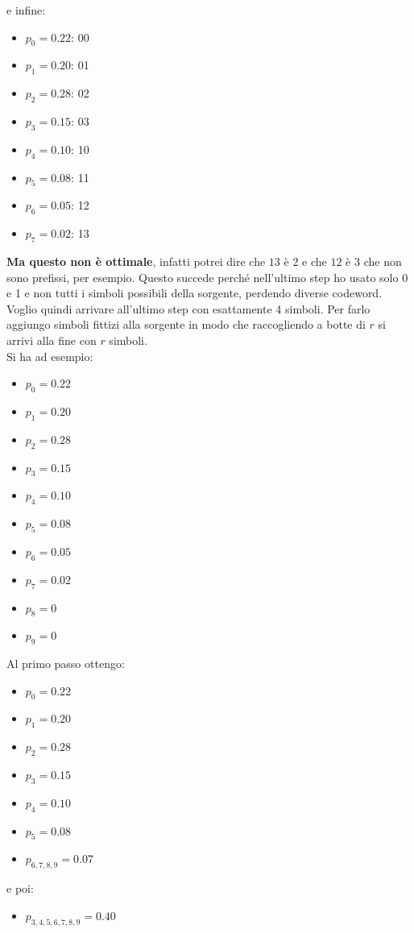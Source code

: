 \documentclass[a4paper,12pt, oneside]{book}
\begin{document}
\begin{esempio}
  e infine:
  \begin{itemize}
    \item $p_0=0.22$: 00
    \item $p_1=0.20$: 01
    \item $p_2=0.28$: 02
    \item $p_3=0.15$: 03
    \item $p_4=0.10$: 10
    \item $p_5=0.08$: 11
    \item $p_6=0.05$: 12
    \item $p_7=0.02$: 13
  \end{itemize}
  \textbf{Ma questo non è ottimale}, infatti potrei dire che $13$ è 2 e che $12$
  è $3$ che non sono prefissi, per esempio. Questo succede perché nell'ultimo
  step ho usato solo 0 e 1 e non tutti i simboli possibili della sorgente,
  perdendo diverse codeword. Voglio quindi arrivare all'ultimo step con
  esattamente 4 simboli. Per farlo aggiungo simboli fittizi alla sorgente in
  modo che raccogliendo a botte di $r$ si arrivi alla fine con $r$ simboli.\\
  Si ha ad esempio:
  \begin{itemize}
    \item $p_0=0.22$
    \item $p_1=0.20$
    \item $p_2=0.28$
    \item $p_3=0.15$
    \item $p_4=0.10$
    \item $p_5=0.08$
    \item $p_6=0.05$
    \item $p_7=0.02$
    \item $p_8=0$
    \item $p_9=0$
  \end{itemize}
  Al primo passo ottengo:
  \begin{itemize}
    \item $p_0=0.22$
    \item $p_1=0.20$
    \item $p_2=0.28$
    \item $p_3=0.15$
    \item $p_4=0.10$
    \item $p_5=0.08$
    \item $p_{6,7,8,9}=0.07$
  \end{itemize}
  e poi:
  \begin{itemize}
    \item $p_{3,4,5,6,7,8,9}=0.40$

\end{itemize}
\end{esempio}
\end{document}
